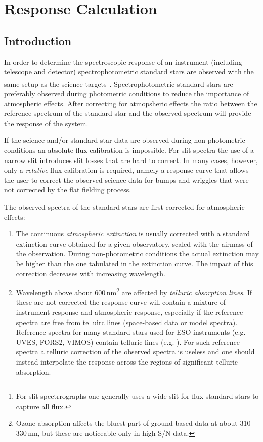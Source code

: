 \section{Response Calculation}
\label{chap:algorithms:response}
\subsection{Introduction}
In order to determine the spectroscopic response of an instrument (including
telescope and detector) spectrophotometric standard stars are observed
with the same setup as the science targets\footnote{For slit
  spectrrographs one generally uses a wide slit for flux standard
  stars to capture all flux.}. Spectrophotometric standard stars are
preferably observed during photometric conditions to reduce the
importance of atmospheric effects. After correcting for atmopsheric
effects the ratio between the reference spectrum of the standard star
and the observed spectrum will provide the response of the system.

If the science and/or standard star
data are observed during non-photometric conditions an absolute flux
calibration is impossible. For slit spectra the use of a narrow slit
introduces slit losses that are hard to correct. In many cases,
however, only a {\em relative} flux calibration is required, namely a
response curve that allows the user to correct the observed science
data for bumps and wriggles that were not corrected by the flat
fielding process.

The observed spectra of the standard
stars are first corrected for atmospheric effects:
\begin{enumerate}
\item The continuous {\em atmospheric extinction} is usually corrected
  with a standard extinction curve obtained for a given observatory,
  scaled with the airmass of the observation. During non-photometric
  conditions the actual extinction may be higher than the one
  tabulated in the extinction curve. The impact of this correction
  decreases with increasing wavelength. 
\item Wavelength above about 600\,nm\footnote{Ozone absorption affects
    the bluest part of ground-based data at about 310--330\,nm, but these are
    noticeable only in high S/N data.} are affected by {\em telluric
    absorption lines}. If these are not corrected the response curve
  will contain a mixture of instrument response and atmospheric
  response, especially if the reference spectra are free from telluirc
  lines (space-based data or model spectra). Reference spectra for
  many standard stars used for ESO instruments (e.g. UVES, FORS2,
  VIMOS) contain telluric lines
  (e.g. \cite{Hamuy+92,Hamuy+94}). For such reference spectra a
  telluric correction of the observed spectra is useless and one
  should instead interpolate the response across the regions of
  significant telluric absorption.
\end{enumerate}

